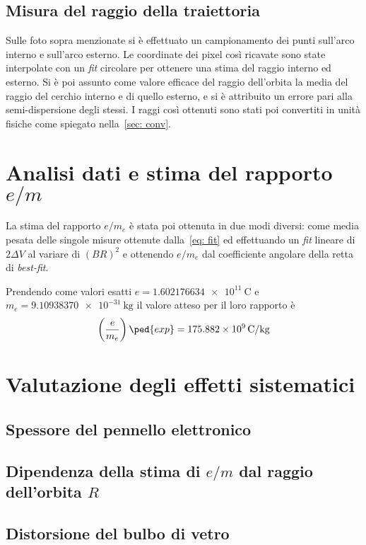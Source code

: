 \documentclass[10pt, a4paper, italian]{article}
\begin{document}
\subsection{Misura del raggio della traiettoria}
Sulle foto sopra menzionate si è effettuato un campionamento dei punti
sull'arco interno e sull'arco esterno. Le coordinate dei pixel così ricavate
sono state interpolate con un \emph{fit} circolare per ottenere una stima del
raggio interno ed esterno. Si è poi assunto come valore efficace del raggio
dell'orbita la media del raggio del cerchio interno e di quello esterno,
e si è attribuito un errore pari alla semi-dispersione degli stessi.
I raggi così ottenuti sono stati poi convertiti in unità fisiche come spiegato
nella~\cref{sec: conv}. \\

\section{Analisi dati e stima del rapporto $e/m$}
La stima del rapporto $ e/m_{e} $ è stata poi ottenuta in due modi diversi:
come media pesata delle singole misure ottenute dalla~\eqref{eq: fit} ed
effettuando un \emph{fit} lineare di $ 2\Delta V $ al variare di
$ (B R)^{2} $ e ottenendo $ e/m_{e} $ dal coefficiente angolare della retta
di \emph{best-fit}.

Prendendo come valori esatti $e = \SI{1.602176634e11}{\coulomb}$ e
$m_{e} = \SI{9.10938370e-31}{\kilogram}$ il valore atteso per il loro
rapporto è
\begin{equation}\label{eq: e-m-exp}
\left(\frac{e}{m_{e}}\right)\ped{exp} = \SI{175.882e9}{\coulomb/\kilogram}
\end{equation}

\section{Valutazione degli effetti sistematici}
\subsection{Spessore del pennello elettronico}

\subsection{Dipendenza della stima di $e/m$ dal raggio dell'orbita $R$}

\subsection{Distorsione del bulbo di vetro}
\end{document}
